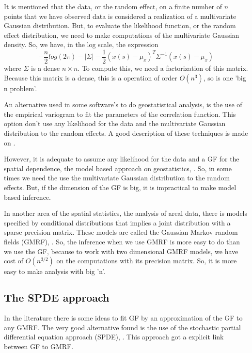 It is mentioned that the data, or the random effect,  
on a finite number of $n$ points that we have observed 
data is considered a realization of a 
multivariate Gaussian distribution. 
But, to evaluate the likelihood function, or the random 
effect distribution, we need to make 
computations of the multivariate Gaussian density. 
So, we have, in the log scale, the expression 
\begin{equation}
-\frac{n}{2}log(2\pi)-|\Sigma| -\frac{1}{2}
(x(s) - \mu_x)^{T}\Sigma^{-1}(x(s)-\mu_x) 
\end{equation}
where $\Sigma$ is a dense $n\times n$. 
To compute this, we need a factorization of this matrix. 
Because this matrix is a dense, this is a operation of 
order $O(n^3)$, so is one 'big n problem'. 

An alternative used in some software's to do 
geostatistical analysis, is the use of the empirical 
variogram to fit the parameters of the correlation 
function. This option don't use any likelihood for 
the data and the multivariate Gaussian 
distribution to the random effects. 
A good description of these techniques is made 
on \cite{cressie:1993}. 

However, it is adequate to assume any likelihood for the 
data and a GF for the spatial dependence, the model 
based approach on geostatistics, \cite{diggleribeiro:2007}. 
So, in some times we need the use the multivariate 
Gaussian distribution to the random effects. 
But, if the dimension of the GF is big, 
it is impractical to make model based inference. 

In another area of the spatial statistics, the 
analysis of areal data, there is models specified 
by conditional distributions that implies a joint 
distribution with a sparse precision matrix. 
These models are called the 
Gaussian Markov random fields (GMRF), 
\cite{RueHeld:2005}. 
So, the inference when we use GMRF is more easy 
to do than we use the GF, because to work with two dimensional 
GMRF models, we have cost of $O(n^{3/2})$ 
on the computations with its precision matrix. 
So, it is more easy to make analysis with big 'n'. 
 
\subsection{The SPDE approach} 

In the literature there is some ideas to 
fit GF by an approximation of the GF to any GMRF. 
The very good alternative found is the use of 
the stochastic partial differential equation 
approach (SPDE), \cite{lindgrenRL:2011}. 
This approach got a explicit link between GF to GMRF. 

